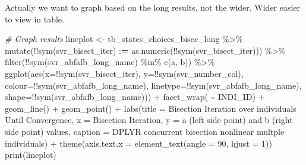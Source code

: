 \documentclass[
]{book}
\newenvironment{Shaded}{\begin{snugshade}}{\end{snugshade}}
\newcommand{\AttributeTok}[1]{\textcolor[rgb]{0.77,0.63,0.00}{#1}}
\newcommand{\CommentTok}[1]{\textcolor[rgb]{0.56,0.35,0.01}{\textit{#1}}}
\newcommand{\DecValTok}[1]{\textcolor[rgb]{0.00,0.00,0.81}{#1}}
\newcommand{\ErrorTok}[1]{\textcolor[rgb]{0.64,0.00,0.00}{\textbf{#1}}}
\newcommand{\FunctionTok}[1]{\textcolor[rgb]{0.00,0.00,0.00}{#1}}
\newcommand{\NormalTok}[1]{#1}
\newcommand{\OtherTok}[1]{\textcolor[rgb]{0.56,0.35,0.01}{#1}}
\newcommand{\SpecialCharTok}[1]{\textcolor[rgb]{0.00,0.00,0.00}{#1}}
\newcommand{\StringTok}[1]{\textcolor[rgb]{0.31,0.60,0.02}{#1}}
\begin{document}
Actually we want to graph based on the long results, not the wider. Wider easier to view in table.

\begin{Shaded}
\begin{Highlighting}[]
\CommentTok{\# Graph results}
\NormalTok{lineplot }\OtherTok{\textless{}{-}}\NormalTok{ tb\_states\_choices\_bisec\_long }\SpecialCharTok{\%\textgreater{}\%}
    \FunctionTok{mutate}\NormalTok{(}\SpecialCharTok{!!}\FunctionTok{sym}\NormalTok{(svr\_bisect\_iter) }\SpecialCharTok{:}\ErrorTok{=} \FunctionTok{as.numeric}\NormalTok{(}\SpecialCharTok{!!}\FunctionTok{sym}\NormalTok{(svr\_bisect\_iter))) }\SpecialCharTok{\%\textgreater{}\%}
    \FunctionTok{filter}\NormalTok{(}\SpecialCharTok{!!}\FunctionTok{sym}\NormalTok{(svr\_abfafb\_long\_name) }\SpecialCharTok{\%in\%} \FunctionTok{c}\NormalTok{(}\StringTok{\textquotesingle{}a\textquotesingle{}}\NormalTok{, }\StringTok{\textquotesingle{}b\textquotesingle{}}\NormalTok{)) }\SpecialCharTok{\%\textgreater{}\%}
    \FunctionTok{ggplot}\NormalTok{(}\FunctionTok{aes}\NormalTok{(}\AttributeTok{x=}\SpecialCharTok{!!}\FunctionTok{sym}\NormalTok{(svr\_bisect\_iter), }\AttributeTok{y=}\SpecialCharTok{!!}\FunctionTok{sym}\NormalTok{(svr\_number\_col),}
               \AttributeTok{colour=}\SpecialCharTok{!!}\FunctionTok{sym}\NormalTok{(svr\_abfafb\_long\_name),}
               \AttributeTok{linetype=}\SpecialCharTok{!!}\FunctionTok{sym}\NormalTok{(svr\_abfafb\_long\_name),}
               \AttributeTok{shape=}\SpecialCharTok{!!}\FunctionTok{sym}\NormalTok{(svr\_abfafb\_long\_name))) }\SpecialCharTok{+}
        \FunctionTok{facet\_wrap}\NormalTok{( }\SpecialCharTok{\textasciitilde{}}\NormalTok{ INDI\_ID) }\SpecialCharTok{+}
        \FunctionTok{geom\_line}\NormalTok{() }\SpecialCharTok{+}
        \FunctionTok{geom\_point}\NormalTok{() }\SpecialCharTok{+}
        \FunctionTok{labs}\NormalTok{(}\AttributeTok{title =} \StringTok{\textquotesingle{}Bisection Iteration over individuals Until Convergence\textquotesingle{}}\NormalTok{,}
             \AttributeTok{x =} \StringTok{\textquotesingle{}Bisection Iteration\textquotesingle{}}\NormalTok{,}
             \AttributeTok{y =} \StringTok{\textquotesingle{}a (left side point) and b (right side point) values\textquotesingle{}}\NormalTok{,}
             \AttributeTok{caption =} \StringTok{\textquotesingle{}DPLYR concurrent bisection nonlinear multple individuals\textquotesingle{}}\NormalTok{) }\SpecialCharTok{+}
      \FunctionTok{theme}\NormalTok{(}\AttributeTok{axis.text.x =} \FunctionTok{element\_text}\NormalTok{(}\AttributeTok{angle =} \DecValTok{90}\NormalTok{, }\AttributeTok{hjust =} \DecValTok{1}\NormalTok{))}
\FunctionTok{print}\NormalTok{(lineplot)}
\end{Highlighting}
\end{Shaded}
\end{document}
